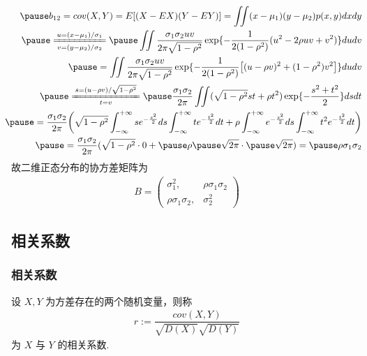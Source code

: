 \begin{frame}

	{\small\begin{eqnarray*}
			&&\hspace{-0.4cm}\pause b_{12}=cov(X,Y)=E[(X-EX)(Y-EY)]=\iint (x-\mu_1)(y-\mu_2)p(x,y)dxdy\\
			&&\hspace{-0.6cm}\pause \xlongequal[v=(y-\mu_2)/\sigma_2]{u=(x-\mu_1)/\sigma_1}\pause \iint \dfrac{\sigma_1\sigma_2uv}{2\pi\sqrt{1-\rho^2}}\exp\{-\dfrac{1}{2(1-\rho^2)}(u^2-2\rho uv+v^2)\}dudv\\
			&&\hspace{-0.6cm}\pause= \iint \dfrac{\sigma_1\sigma_2uv}{2\pi\sqrt{1-\rho^2}}\exp\{-\dfrac{1}{2(1-\rho^2)}\big[(u-\rho v)^2+(1-\rho^2)v^2\big]\}dudv\\
			&&\hspace{-0.6cm}\pause \xlongequal[t=v]{s=(u-\rho v)/\sqrt{1-\rho^2}}\pause \dfrac{\sigma_1\sigma_2}{2\pi}\iint(\sqrt{1-\rho^2}st+\rho t^2) \exp\{-\dfrac{s^2+t^2}{2}\}dsdt\\
			&&\hspace{-0.6cm}\pause =\dfrac{\sigma_1\sigma_2}{2\pi}\bigg(\sqrt{1-\rho^2}\int_{-\infty}^{+\infty}se^{-\frac{s^2}{2}}ds\int_{-\infty}^{+\infty}te^{-\frac{t^2}{2}}dt+\rho\int_{-\infty}^{+\infty}e^{-\frac{s^2}{2}}ds\int_{-\infty}^{+\infty}t^2e^{-\frac{t^2}{2}}dt\bigg)\\
			&&\hspace{-0.6cm}\pause =\dfrac{\sigma_1\sigma_2}{2\pi}(\sqrt{1-\rho^2}\cdot 0+\pause \rho\pause  \sqrt{2\pi}\cdot\pause  \sqrt{2\pi})=\pause \rho \sigma_1\sigma_2
	\end{eqnarray*}}
	\pause   故二维正态分布的协方差矩阵为
	\begin{eqnarray*}
		B=\left(
		\begin{array}{cc}
			\sigma_1^2, &\rho\sigma_1\sigma_2\\
			\rho\sigma_1\sigma_2,&\sigma_2^2
		\end{array}
		\right)
	\end{eqnarray*}

\end{frame}
\subsection{相关系数}
\begin{frame}
	\frametitle{相关系数}
	\begin{defi}
		设 $X, Y$ 为方差存在的两个随机变量，则称
		\begin{eqnarray*}
			r:=\dfrac{cov(X,Y)}{\sqrt{D(X)}\sqrt{D(Y)}}
		\end{eqnarray*}
		为 $X$ 与 $Y$ 的相关系数.
	\end{defi}
\end{frame}

